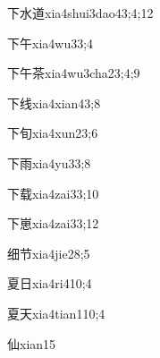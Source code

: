 \begin{verbete}{下水道}{xia4shui3dao4}{3;4;12}
\end{verbete}

\begin{verbete}{下午}{xia4wu3}{3;4}
\end{verbete}

\begin{verbete}{下午茶}{xia4wu3cha2}{3;4;9}
\end{verbete}

\begin{verbete}{下线}{xia4xian4}{3;8}
\end{verbete}

\begin{verbete}{下旬}{xia4xun2}{3;6}
\end{verbete}

\begin{verbete}{下雨}{xia4yu3}{3;8}
\end{verbete}

\begin{verbete}{下载}{xia4zai3}{3;10}
\end{verbete}

\begin{verbete}{下崽}{xia4zai3}{3;12}
\end{verbete}

\begin{verbete}{细节}{xia4jie2}{8;5}
\end{verbete}

\begin{verbete}{夏日}{xia4ri4}{10;4}
\end{verbete}

\begin{verbete}{夏天}{xia4tian1}{10;4}
\end{verbete}

\begin{verbete}{仙}{xian1}{5}
\end{verbete}


